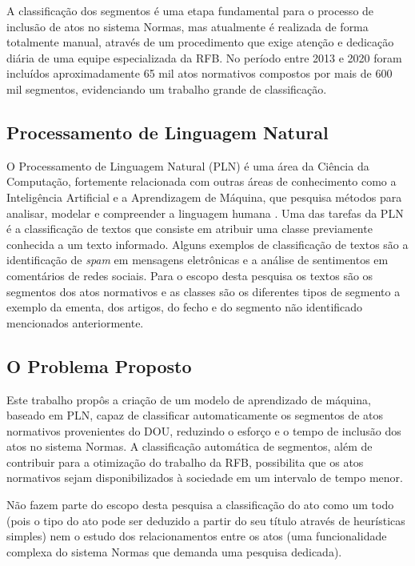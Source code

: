 A classificação dos segmentos é uma etapa fundamental para o processo de inclusão de atos no sistema Normas, mas atualmente é realizada de forma totalmente manual, através de um procedimento que exige atenção e dedicação diária de uma equipe especializada da RFB. No período entre 2013 e 2020 foram incluídos aproximadamente 65 mil atos normativos compostos por mais de 600 mil segmentos, evidenciando um trabalho grande de classificação.

\subsection{Processamento de Linguagem Natural}

O Processamento de Linguagem Natural (PLN) é uma área da Ciência da Computação, fortemente relacionada com outras áreas de conhecimento como a Inteligência Artificial e a Aprendizagem de Máquina, que pesquisa métodos para analisar, modelar e compreender a linguagem humana \cite{PracticalNLP2020}. Uma das tarefas da PLN é a classificação de textos que consiste em atribuir uma classe previamente conhecida a um texto informado. Alguns exemplos de classificação de textos são a identificação de \textit{spam} em mensagens eletrônicas e a análise de sentimentos em comentários de redes sociais. Para o escopo desta pesquisa os textos são os segmentos dos atos normativos e as classes são os diferentes tipos de segmento a exemplo da ementa, dos artigos, do fecho e do segmento não identificado mencionados anteriormente. 

\subsection{O Problema Proposto}

Este trabalho propôs a criação de um modelo de aprendizado de máquina, baseado em PLN, capaz de classificar automaticamente os segmentos de atos normativos provenientes do DOU, reduzindo o esforço e o tempo de inclusão dos atos no sistema Normas. A classificação automática de segmentos, além de contribuir para a otimização do trabalho da RFB, possibilita que os atos normativos sejam disponibilizados à sociedade em um intervalo de tempo menor.

Não fazem parte do escopo desta pesquisa a classificação do ato como um todo (pois o tipo do ato pode ser deduzido a partir do seu título através de heurísticas simples) nem o estudo dos relacionamentos entre os atos (uma funcionalidade complexa do sistema Normas que demanda uma pesquisa dedicada).

